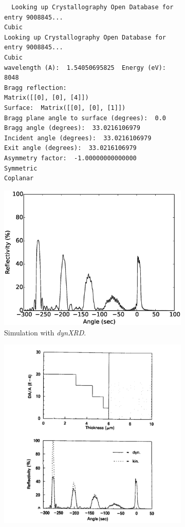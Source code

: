 \documentclass[12pt,oneside,notitlepage,abstracton,a4paper]{scrartcl}
\begin{document}
\newpage
\begin{figure}[h]
 \centering
 \begin{subfigure}[h]{0.49\textwidth}
  \begin{lstlisting}
  Looking up Crystallography Open Database for entry 9008845...
Cubic
Looking up Crystallography Open Database for entry 9008845...
Cubic
wavelength (A):  1.54050695825  Energy (eV):  8048
Bragg reflection: 
Matrix([[0], [0], [4]])
Surface:  Matrix([[0], [0], [1]])
Bragg plane angle to surface (degrees):  0.0
Bragg angle (degrees):  33.0216106979
Incident angle (degrees):  33.0216106979
Exit angle (degrees):  33.0216106979
Asymmetry factor:  -1.00000000000000
Symmetric
Coplanar
  \end{lstlisting}
  \includegraphics[width=\textwidth]{pics/GaAs.eps}
  \caption{Simulation with \textit{dynXRD}.}
  \label{GaAs}
 \end{subfigure}
 \begin{subfigure}[h]{0.50\textwidth}
  \includegraphics[width=1.2\textwidth]{pics/GaAs.png}

\end{subfigure}
\end{figure}
\end{document}
